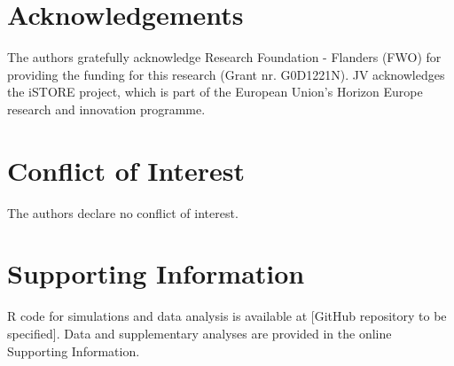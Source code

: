 \documentclass[alpha-refs]{wiley-article}
\begin{document}
\section*{Acknowledgements}
The authors gratefully acknowledge Research Foundation - Flanders (FWO) for providing the funding for this research (Grant nr. G0D1221N). JV acknowledges the iSTORE project, which is part of the European Union's Horizon Europe research and innovation programme.

\section*{Conflict of Interest}

The authors declare no conflict of interest.

\section*{Supporting Information}

R code for simulations and data analysis is available at [GitHub repository to be specified]. Data and supplementary analyses are provided in the online Supporting Information.

\printendnotes


\end{document}
